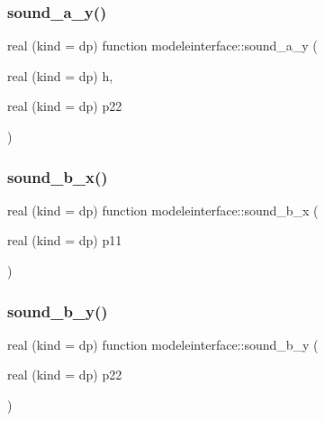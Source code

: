 \mbox{\label{namespacemodeleinterface_aea42339ec55b6d0e7333dcd4c2d6041f}} 
\subsubsection{\texorpdfstring{sound\+\_\+a\+\_\+y()}{sound\_a\_y()}}
{\footnotesize\ttfamily real (kind = dp) function modeleinterface\+::sound\+\_\+a\+\_\+y (\begin{DoxyParamCaption}\item[{real (kind = dp)}]{h,  }\item[{real (kind = dp)}]{p22 }\end{DoxyParamCaption})}

\mbox{\label{namespacemodeleinterface_aa422a9d23665a7fa175a3458f15d6be2}} 
\subsubsection{\texorpdfstring{sound\+\_\+b\+\_\+x()}{sound\_b\_x()}}
{\footnotesize\ttfamily real (kind = dp) function modeleinterface\+::sound\+\_\+b\+\_\+x (\begin{DoxyParamCaption}\item[{real (kind = dp)}]{p11 }\end{DoxyParamCaption})}

\mbox{\label{namespacemodeleinterface_ae6539d207be975bdb5b8c45826062a30}} 
\subsubsection{\texorpdfstring{sound\+\_\+b\+\_\+y()}{sound\_b\_y()}}
{\footnotesize\ttfamily real (kind = dp) function modeleinterface\+::sound\+\_\+b\+\_\+y (\begin{DoxyParamCaption}\item[{real (kind = dp)}]{p22 }\end{DoxyParamCaption})}

